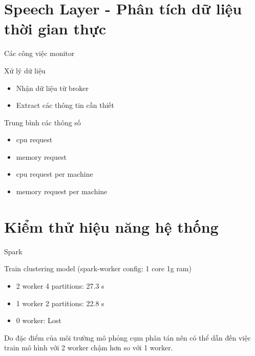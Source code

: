 \documentclass[10pt,xcolor={dvipsnames}]{beamer}
\begin{document}
	\section{Speech Layer - Phân tích dữ liệu thời gian thực} 
	
	\begin{frame}
	{Các công việc monitor}
		\begin{block}
		{Xử lý dữ liệu}
		\begin{itemize}
			\item Nhận dữ liệu từ broker
			\item Extract các thông tin cần thiết
		\end{itemize}
		\end{block}
		
		\begin{block}
		{Trung bình các thông số}
		\begin{itemize}
			\item cpu request
			\item memory request
			\item cpu request per machine
			\item memory request per machine
		\end{itemize}
		\end{block}
	\end{frame}
	
	\section{Kiểm thử hiệu năng hệ thống}
	
	\begin{frame}
	{Spark}
		\begin{block}
		{Train clustering model (spark-worker config: 1 core 1g ram)}
		\begin{itemize}
			\item 2 worker 4 partitions: 27.3 s 
			\item 1 worker 2 partitions: 22.8 s
			\item 0 worker: Lost
		\end{itemize}
		Do đặc điểm của môi trường mô phỏng cụm phân tán nên có thể dẫn đến việc train mô hình với 2 worker chậm hơn so với 1 worker.
		\end{block}
	\end{frame}
	
\end{document}
